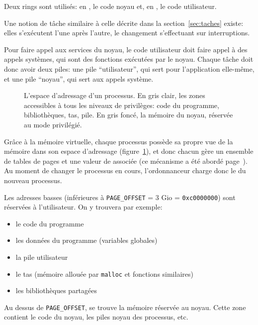 Deux rings sont utilisés: en , le code noyau et, en , le code
utilisateur.

Une notion de tâche similaire à celle décrite dans la section~\ref{sec:taches}
existe: elles s'exécutent l'une après l'autre, le changement s'effectuant sur
interruptions.

Pour faire appel aux services du noyau, le code utilisateur doit faire appel à
des appels systèmes, qui sont des fonctions exécutées par le noyau. Chaque tâche
doit donc avoir deux piles: une pile \enquote{utilisateur}, qui sert pour
l'application elle-même, et une pile \enquote{noyau}, qui sert aux appels
système.

\begin{figure} %
\centering


\caption[Espace d'adressage d'un processus]{L'espace d'adressage d'un processus.
En gris clair, les zones accessibles à tous les niveaux de privilèges: code du
programme, bibliothèques, tas, pile. En gris foncé, la mémoire du noyau,
réservée au mode privilégié.}

\label{fig:memmap}
\end{figure}

Grâce à la mémoire virtuelle, chaque processus possède sa propre vue de la
mémoire dans son espace d'adressage (figure~\ref{fig:memmap}), et donc chacun
gère un ensemble de tables de pages et une valeur de \crtrois{} associée (ce
mécanisme a été abordé page~\pageref{page:mem-virt}). Au moment de changer le
processus en cours, l'ordonnanceur charge donc le \crtrois{} du nouveau
processus.

Les adresses basses (inférieures à \texttt{PAGE\_OFFSET} = 3 Gio =
\texttt{0xc0000000}) sont réservées à l'utilisateur. On y trouvera par exemple:

\begin{itemize}
\item le code du programme
\item les données du programme (variables globales)
\item la pile utilisateur
\item le tas (mémoire allouée par \texttt{malloc} et fonctions similaires)
\item les bibliothèques partagées
\end{itemize}

Au dessus de \texttt{PAGE\_OFFSET}, se trouve la mémoire réservée au noyau.
Cette zone contient le code du noyau, les piles noyau des processus, etc.

